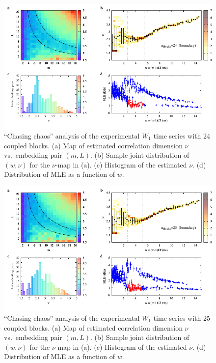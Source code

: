 \begin{appendices}
\begin{figure}[!htbp]
    \centering
    \includegraphics[width=\linewidth]{../blocks/24_blocks/2e5_points/plots/chaos_low.pdf}
    \caption{``Chasing chaos'' analysis of the experimental $W_1$ time series with 24 coupled blocks.
    (a) Map of estimated correlation dimension $\nu$ vs.\ embedding pair $(m, L)$.
    (b) Sample joint distribution of $(w,\nu)$ for the $\nu$-map in (a).
    (c) Histogram of the estimated $\nu$. (d) Distribution of MLE as a function of $w$.
    } 
\end{figure}

\begin{figure}[!htbp]
    \centering
    \includegraphics[width=\linewidth]{../blocks/25_blocks/edge/2e5_points/plots/chaos_low.pdf}
    \caption{``Chasing chaos'' analysis of the experimental $W_1$ time series with 25 coupled blocks.
    (a) Map of estimated correlation dimension $\nu$ vs.\ embedding pair $(m, L)$.
    (b) Sample joint distribution of $(w,\nu)$ for the $\nu$-map in (a).
    (c) Histogram of the estimated $\nu$. (d) Distribution of MLE as a function of $w$.
    } 
\end{figure}


\end{appendices}
